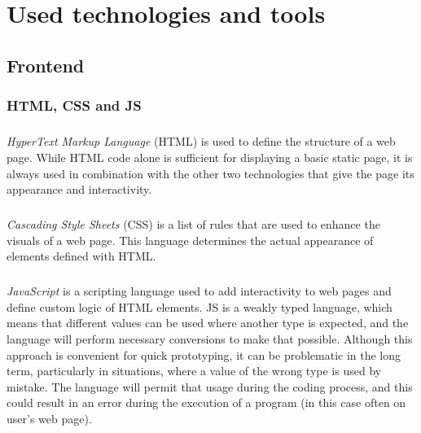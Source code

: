 \chapter{Used technologies and tools} \label{chr:usedTools}

\section{Frontend}

\subsection{HTML, CSS and JS}

\paragraph{}

\emph{HyperText Markup Language} (HTML) is used to define the structure of a web page. While HTML code alone is sufficient for displaying a basic static page, it is always used in combination with the other two technologies that give the page its appearance and interactivity. \cite{html}

\paragraph{}

\emph{Cascading Style Sheets} (CSS) is a list of rules that are used to enhance the visuals of a web page. This language determines the actual appearance of elements defined with HTML. \cite{front_101}

\paragraph{}

\emph{JavaScript} is a scripting language used to add interactivity to web pages and define custom logic of HTML elements. JS is a weakly typed language, which means that different values can be used where another type is expected, and the language will perform necessary conversions to make that possible. Although this approach is convenient for quick prototyping, it can be problematic in the long term, particularly in situations, where a value of the wrong type is used by mistake. The language will permit that usage during the coding process, and this could result in an error during the execution of a program (in this case often on user's web page). 

